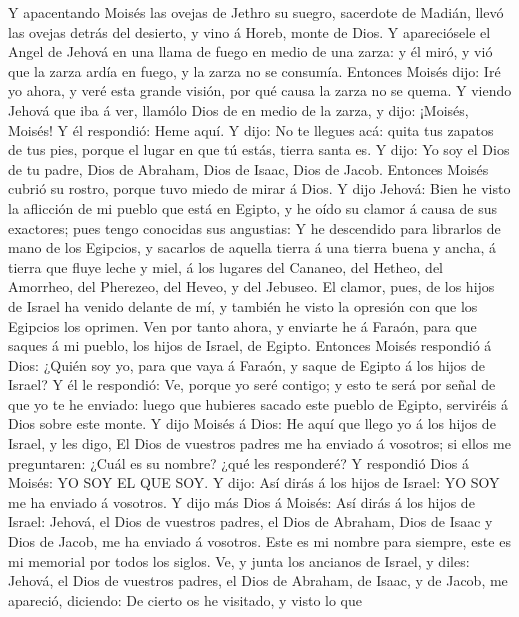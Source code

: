  Y apacentando Moisés las ovejas de Jethro su suegro,
sacerdote de Madián, llevó las ovejas detrás del desierto, y vino á
Horeb, monte de Dios.  Y apareciósele el Angel de Jehová en
una llama de fuego en medio de una zarza: y él miró, y vió que la zarza
ardía en fuego, y la zarza no se consumía.  Entonces Moisés
dijo: Iré yo ahora, y veré esta grande visión, por qué causa la zarza no
se quema.  Y viendo Jehová que iba á ver, llamólo Dios de en
medio de la zarza, y dijo: ¡Moisés, Moisés! Y él respondió: Heme aquí.
 Y dijo: No te llegues acá: quita tus zapatos de tus pies,
porque el lugar en que tú estás, tierra santa es.  Y dijo:
Yo soy el Dios de tu padre, Dios de Abraham, Dios de Isaac, Dios de
Jacob. Entonces Moisés cubrió su rostro, porque tuvo miedo de mirar á
Dios.  Y dijo Jehová: Bien he visto la aflicción de mi
pueblo que está en Egipto, y he oído su clamor á causa de sus exactores;
pues tengo conocidas sus angustias:  Y he descendido para
librarlos de mano de los Egipcios, y sacarlos de aquella tierra á una
tierra buena y ancha, á tierra que fluye leche y miel, á los lugares del
Cananeo, del Hetheo, del Amorrheo, del Pherezeo, del Heveo, y del
Jebuseo.  El clamor, pues, de los hijos de Israel ha venido
delante de mí, y también he visto la opresión con que los Egipcios los
oprimen.  Ven por tanto ahora, y enviarte he á Faraón, para
que saques á mi pueblo, los hijos de Israel, de Egipto. 
Entonces Moisés respondió á Dios: ¿Quién soy yo, para que vaya á Faraón,
y saque de Egipto á los hijos de Israel?  Y él le
respondió: Ve, porque yo seré contigo; y esto te será por señal de que
yo te he enviado: luego que hubieres sacado este pueblo de Egipto,
serviréis á Dios sobre este monte.  Y dijo Moisés á Dios:
He aquí que llego yo á los hijos de Israel, y les digo, El Dios de
vuestros padres me ha enviado á vosotros; si ellos me preguntaren: ¿Cuál
es su nombre? ¿qué les responderé?  Y respondió Dios á
Moisés: YO SOY EL QUE SOY. Y dijo: Así dirás á los hijos de Israel: YO
SOY me ha enviado á vosotros.  Y dijo más Dios á Moisés:
Así dirás á los hijos de Israel: Jehová, el Dios de vuestros padres, el
Dios de Abraham, Dios de Isaac y Dios de Jacob, me ha enviado á
vosotros. Este es mi nombre para siempre, este es mi memorial por todos
los siglos.  Ve, y junta los ancianos de Israel, y diles:
Jehová, el Dios de vuestros padres, el Dios de Abraham, de Isaac, y de
Jacob, me apareció, diciendo: De cierto os he visitado, y visto lo que
